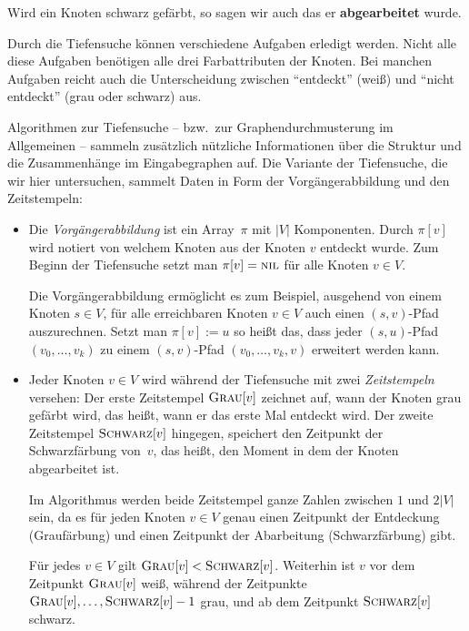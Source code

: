 \begin{bem}
Wird ein Knoten schwarz gefärbt, so sagen wir auch das er \textbf{abgearbeitet} wurde.

Durch die Tiefensuche können verschiedene Aufgaben erledigt werden. Nicht alle diese Aufgaben benötigen alle drei Farbattributen der Knoten. Bei manchen Aufgaben reicht auch die Unterscheidung zwischen ``entdeckt'' (weiß) und ``nicht entdeckt'' (grau oder schwarz) aus. 
\end{bem}

\begin{bem}
Algorithmen zur Tiefensuche -- bzw.~zur Graphendurchmusterung im Allgemeinen -- sammeln zusätzlich nützliche Informationen über die Struktur und die Zusammenhänge im Eingabegraphen auf.
Die Variante der Tiefensuche, die wir hier untersuchen, sammelt Daten in Form der Vorgängerabbildung und den Zeitstempeln:
%
\begin{itemize}
 \item Die \emph{Vorgängerabbildung} ist ein Array~$\pi$ mit $|V|$ Komponenten.
 Durch $\pi[v]$ wird notiert von welchem Knoten aus der Knoten $v$ entdeckt wurde.
 Zum Beginn der Tiefensuche setzt man $\pi[v]=\mathop{\text{\textsc{nil}}}$ für alle Knoten $v \in V$.

 Die Vorgängerabbildung ermöglicht es zum Beispiel, ausgehend von einem Knoten $s \in V$, für alle erreichbaren Knoten $v \in V$ auch einen $(s,v)$-Pfad auszurechnen.
Setzt man $\pi[v]:=u$ so heißt das, dass jeder $(s,u)$-Pfad $(v_0,\ldots,v_k)$ zu einem $(s,v)$-Pfad $(v_0,\ldots,v_k,v)$ erweitert werden kann.
 \item Jeder Knoten $v \in V$ wird während der Tiefensuche mit zwei \emph{Zeitstempeln} versehen: Der erste Zeitstempel $\mathop{\text{\textsc{Grau}}}[v]$ zeichnet auf, wann der Knoten grau gefärbt wird, das heißt, wann er das erste Mal entdeckt wird.
Der zweite Zeitstempel $\mathop{\text{\textsc{Schwarz}}}[v]$ hingegen, speichert den Zeitpunkt der Schwarzfärbung von~$v$, das heißt, den Moment in dem der Knoten abgearbeitet ist.

Im Algorithmus werden beide Zeitstempel ganze Zahlen zwischen $1$ und $2 |V|$ sein, da es für jeden Knoten $v \in V$ genau einen Zeitpunkt der Entdeckung (Graufärbung) und einen Zeitpunkt der Abarbeitung (Schwarzfärbung) gibt.

Für jedes $v \in V$ gilt $\mathop{\text{\textsc{Grau}}}[v] < \mathop{\text{\textsc{Schwarz}}}[v]$.
Weiterhin ist $v$ vor dem Zeitpunkt $\mathop{\text{\textsc{Grau}}}[v]$ weiß, während der Zeitpunkte $\mathop{\text{\textsc{Grau}}}[v],\ldots,\mathop{\text{\textsc{Schwarz}}}[v]-1$ grau, und ab dem Zeitpunkt $\mathop{\text{\textsc{Schwarz}}}[v]$ schwarz.

\end{itemize}
\end{bem}

